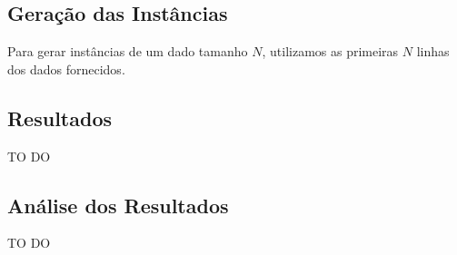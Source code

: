 \documentclass{article}
\begin{document}
\subsection{Geração das Instâncias}

Para gerar instâncias de um dado tamanho $N$, utilizamos as primeiras $N$ linhas dos dados fornecidos.

\subsection{Resultados}

{\huge TO DO}

\subsection{Análise dos Resultados}

{\huge TO DO}



\end{document}
